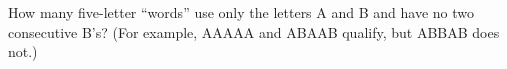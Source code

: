 How many five-letter ``words'' use only the letters A and B and have no two consecutive B's? (For example, AAAAA and ABAAB qualify, but ABBAB does not.)

